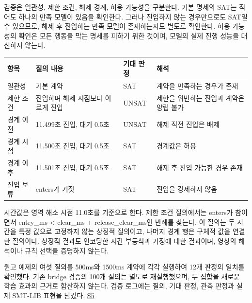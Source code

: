 \documentclass[11pt,a4paper]{article}
\begin{document}
검증은 일관성, 제한 조건, 해제 경계, 허용 가능성을 구분한다. 기본 명세의 SAT는 적어도 하나의 만족 모델이 있음을 확인한다. 그러나 진입하지 않는 경우만으로도 SAT일 수 있으므로, 해제 후 진입하는 만족 모델이 존재하는지도 별도로 확인한다. 허용 가능성의 확인은 모든 행동을 막는 명세를 피하기 위한 것이며, 모델의 실제 진행 성능을 대신하지 않는다.\par

\par\medskip\noindent\begin{minipage}{\linewidth}\small
\begin{tabular}{@{}>{\raggedright\arraybackslash}p{}>{\raggedright\arraybackslash}p{}>{\raggedright\arraybackslash}p{}>{\raggedright\arraybackslash}p{}@{}}
\toprule
\textbf{항목} & \textbf{질의 내용} & \textbf{기대 판정} & \textbf{해석} \\
\midrule
일관성 & 기본 계약 & SAT & 계약을 만족하는 경우가 존재 \\
제한 조건 & 진입하며 해제 시점보다 이르게 진입 & UNSAT & 제한을 위반하는 진입과 계약은 양립 불가 \\
경계 이전 & 11.499초 진입, 대기 0.5초 & UNSAT & 해제 직전 진입은 배제 \\
경계 시점 & 11.500초 진입, 대기 0.5초 & SAT & 경계값은 허용 \\
경계 이후 & 11.501초 진입, 대기 0.5초 & SAT & 해제 후 진입 가능한 경우 존재 \\
진입 보류 & enters가 거짓 & SAT & 진입을 강제하지 않음 \\
\bottomrule\end{tabular}\end{minipage}\par\medskip

시간값은 영역 해소 시점 11.0초를 기준으로 한다. 제한 조건 질의에서는 {\ttfamily\small enters}가 참이면서 {\ttfamily\small entry\_ms < clear\_ms + release\_clear\_ms}인 반례를 찾는다. 이 질의는 두 시간을 특정 값으로 고정하지 않는 상징적 질의이고, 나머지 경계 행은 구체적 값을 연결한 질의이다. 상징적 결과도 인코딩한 시간 부등식과 가정에 대한 결과이며, 영상의 해석이나 규칙 선택을 증명하지 않는다.\par

원고 예제의 여섯 질의를 500ms와 1500ms 계약에 각각 실행하여 12개 판정의 일치를 확인했다. 기존 bridge 검증의 100개 질의는 별도로 재실행했으며, 두 집합을 새로운 학습 효과의 근거로 합산하지 않는다. 검증 로그에는 질의, 기대 판정, 관측 판정과 실제 SMT-LIB 표현을 남겼다. \href{\detokenize{../methodology-2026-09-30-001/manuscript_examples.json}}{S5}\par
\end{document}

